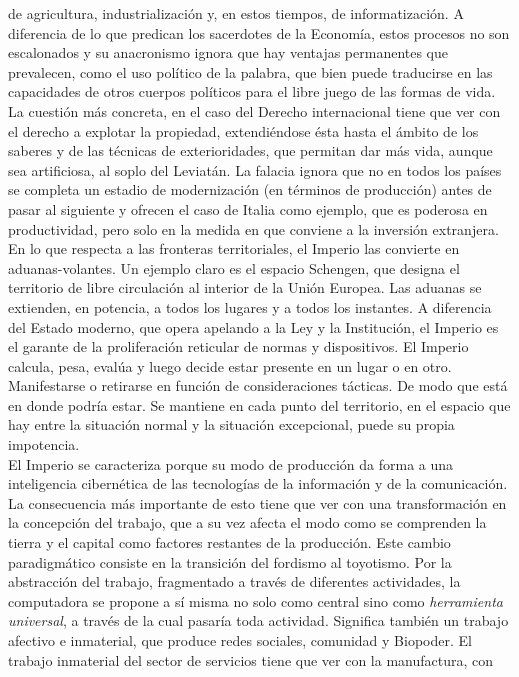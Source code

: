 \documentclass[
]{article}
\begin{document}
de agricultura, industrialización y, en estos tiempos, de
informatización. A diferencia de lo que predican los sacerdotes de la
Economía, estos procesos no son escalonados y su anacronismo ignora que
hay ventajas permanentes que prevalecen, como el uso político de la
palabra, que bien puede traducirse en las capacidades de otros cuerpos
políticos para el libre juego de las formas de vida. La cuestión más
concreta, en el caso del Derecho internacional tiene que ver con el
derecho a explotar la propiedad, extendiéndose ésta hasta el ámbito de
los saberes y de las técnicas de exterioridades, que permitan dar más
vida, aunque sea artificiosa, al soplo del Leviatán. La falacia ignora
que no en todos los países se completa un estadio de modernización (en
términos de producción) antes de pasar al siguiente y ofrecen el caso de
Italia como ejemplo, que es poderosa en productividad, pero solo en la
medida en que conviene a la inversión extranjera. En lo que respecta a
las fronteras territoriales, el Imperio las convierte en
aduanas-volantes. Un ejemplo claro es el espacio Schengen, que designa
el territorio de libre circulación al interior de la Unión Europea. Las
aduanas se extienden, en potencia, a todos los lugares y a todos los
instantes. A diferencia del Estado moderno, que opera apelando a la Ley
y la Institución, el Imperio es el garante de la proliferación reticular
de normas y dispositivos. El Imperio calcula, pesa, evalúa y luego
decide estar presente en un lugar o en otro. Manifestarse o retirarse en
función de consideraciones tácticas. De modo que está en donde podría
estar. Se mantiene en cada punto del territorio, en el espacio que hay
entre la situación normal y la situación excepcional, puede su propia
impotencia.\\
El Imperio se caracteriza porque su modo de producción da forma a una
inteligencia cibernética de las tecnologías de la información y de la
comunicación. La consecuencia más importante de esto tiene que ver con
una transformación en la concepción del trabajo, que a su vez afecta el
modo como se comprenden la tierra y el capital como factores restantes
de la producción. Este cambio paradigmático consiste en la transición
del fordismo al toyotismo. Por la abstracción del trabajo, fragmentado a
través de diferentes actividades, la computadora se propone a sí misma
no solo como central sino como \emph{herramienta universal}, a través de
la cual pasaría toda actividad. Significa también un trabajo afectivo e
inmaterial, que produce redes sociales, comunidad y Biopoder. El trabajo
inmaterial del sector de servicios tiene que ver con la manufactura, con
\end{document}
